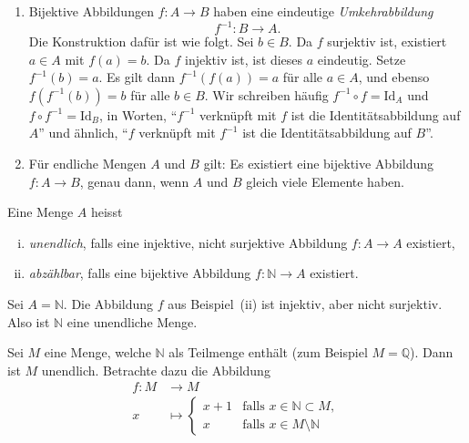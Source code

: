 \documentclass[../main.tex]{subfiles}
\begin{document}
\begin{remarks}
  \leavevmode
  \begin{enumerate}[(1)]
    \item Bijektive Abbildungen $f \colon A \to B$ haben eine eindeutige \emph{Umkehrabbildung}
      \[
       f^{-1} \colon B \to A.
      \]
      Die Konstruktion dafür ist wie folgt. Sei $b \in B$.
      Da $f$ surjektiv ist, existiert $a \in A$ mit $f(a) = b$. Da $f$
      injektiv ist, ist dieses $a$ eindeutig. Setze $f^{-1}(b) = a$. Es gilt dann
      \(f^{-1}(f(a)) = a\)
      für alle $a \in A$, und ebenso
      \(f(f^{-1}(b)) = b\)
      für alle $b \in B$. Wir schreiben häufig
      \(f^{-1} \circ f = \textrm{Id}_{A}\) und
      \(f \circ f^{-1} = \textrm{Id}_{B}\),
      in Worten, ``$f^{-1}$ verknüpft mit $f$ ist die Identitätsabbildung auf $A$''
      und ähnlich, ``$f$ verknüpft mit $f^{-1}$ ist die Identitätsabbildung auf $B$''.
    \item Für endliche Mengen $A$ und $B$ gilt: Es existiert eine bijektive Abbildung
      $f: A \to B$, genau dann, wenn $A$ und $B$ gleich viele Elemente haben.
  \end{enumerate}
\end{remarks}

\begin{definition}
  Eine Menge $A$ heisst
  \begin{enumerate}[(i)]
    \item \emph{unendlich}, falls eine injektive, nicht surjektive Abbildung
      $f: A \to A$ existiert,
    \item \emph{abzählbar}, falls eine bijektive Abbildung $f \colon \mathbb N \to A$
      existiert.
  \end{enumerate}
\end{definition}

\begin{example}
  Sei $A = \mathbb N$. Die Abbildung $f$ aus Beispiel~(ii) ist injektiv,
  aber nicht surjektiv. Also ist $\mathbb N$ eine unendliche Menge.
\end{example}

\begin{example}
  Sei $M$ eine Menge, welche $\mathbb N$ als Teilmenge enthält
  (zum Beispiel $M = \mathbb Q$).
  Dann ist $M$ unendlich. Betrachte dazu die Abbildung
  \begin{align*}
    f \colon M &\to M \\
    x &\mapsto
      \begin{cases}
        x+1 & \mbox{falls }x \in \mathbb N \subset M, \\
        x & \mbox{falls }x \in M \setminus \mathbb N
      \end{cases}
  \end{align*}
\end{example}
\end{document}
